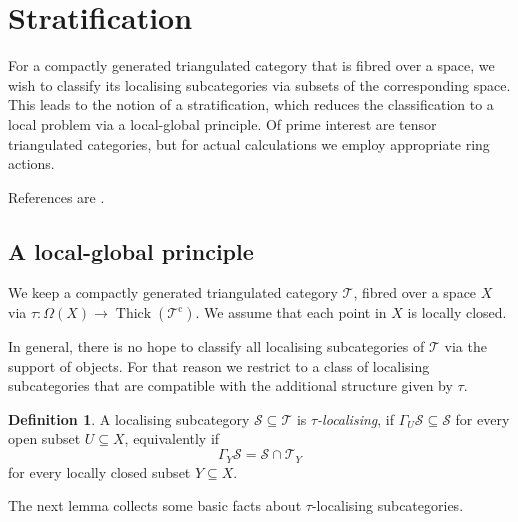 \documentclass{amsart}[a4]
\theoremstyle{definition}
\newtheorem{definition}[theorem]{Definition}
\theoremstyle{remark}
\numberwithin{equation}{section}
\newcommand{\Thick}{\operatorname{Thick}}
\newcommand{\cat}{\mathcal}
\let\Gamma\varGamma
\let\Omega\varOmega
\begin{document}
\section{Stratification}

For a compactly generated triangulated category that is fibred over a
space, we wish to classify its localising subcategories via subsets of
the corresponding space. This leads to the notion of a stratification,
which reduces the classification to a local problem via a local-global
principle. Of prime interest are tensor triangulated categories, but
for actual calculations we employ appropriate ring actions.

References are \cite{Balmer/Favi:2011a,Benson/Iyengar/Krause:2011a,
  Benson/Iyengar/Krause:2012b}.


\subsection*{A local-global principle}

We keep a compactly generated triangulated category $\cat T$, fibred
over a space $X$ via $\tau\colon\Omega(X)\to\Thick(\cat T^{\mathrm c})$. We
assume that each point in $X$ is locally closed.

In general, there is no hope to classify all localising subcategories
of $\cat T$ via the support of objects. For that reason we restrict to a
class of localising subcategories that are compatible with the
additional structure given by $\tau$.

\begin{definition}
  A localising subcategory $\cat S\subseteq\cat T$ is
  \emph{$\tau$-localising}, if $\Gamma_U\cat S\subseteq\cat S$ for
  every open subset $U\subseteq X$, equivalently if
  \[\Gamma_Y\cat S=\cat S\cap \cat T_Y\] for every locally closed subset
  $Y\subseteq X$.
\end{definition}

The next lemma collects some basic facts about $\tau$-localising subcategories.
\end{document}
